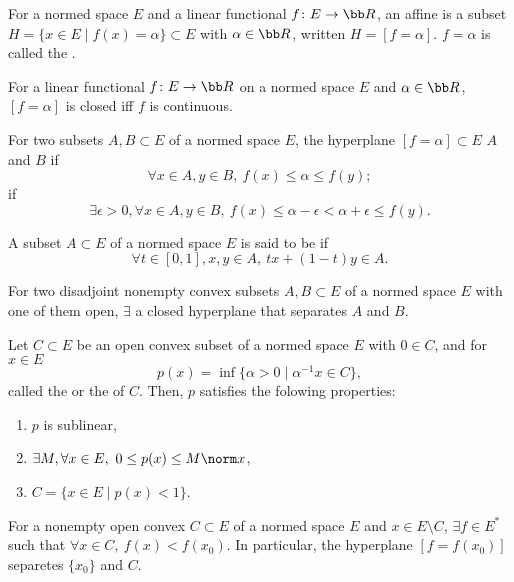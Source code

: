 For a normed space $E$ and a linear functional $f \colon E \to \bb R$, an affine  is a subset $H = \{ x \in E \mid f(x) = \alpha \} \subset E$ with $\alpha \in \bb R$, written $H = [f = \alpha]$. $f = \alpha$ is called the .

For a linear functional $f \colon E \to \bb R$ on a normed space $E$ and $\alpha \in \bb R$, $[f = \alpha]$ is closed iff $f$ is continuous.

For two subsets $A, B \subset E$ of a normed space $E$, the hyperplane $[f = \alpha] \subset E$  $A$ and $B$ if
\[
  \forall x \in A, y \in B,\ f(x) \le \alpha \le f(y);
\]
 if
\[
  \exists \epsilon > 0, \forall x \in A, y \in B,\ f(x) \le \alpha - \epsilon < \alpha + \epsilon \le f(y).
\]

A subset $A \subset E$ of a normed space $E$ is said to be  if
\[
  \forall t \in [0, 1], x, y \in A,\ tx + (1-t)y \in A.
\]

For two disadjoint nonempty convex subsets $A, B \subset E$ of a normed space $E$ with one of them open, $\exists$ a closed hyperplane that separates $A$ and $B$.

Let $C \subset E$ be an open convex subset of a normed space $E$ with $0 \in C$, and for $x \in E$
\[
  p(x) = \inf \{ \alpha > 0 \mid \alpha^{-1} x \in C \},
\]
called the  or the  of $C$.
Then, $p$ satisfies the folowing properties:
\begin{enumerate}
\item $p$ is sublinear,
\item $\exists M, \forall x \in E,\ 0 \le p(x) \le M \norm x$,
\item $C = \{ x \in E \mid p(x) < 1\}$.
\end{enumerate}

For a nonempty open convex $C \subset E$ of a normed space $E$ and $x \in E \setminus C$, $\exists f \in E^*$ such that $\forall x \in C,\ f(x) < f(x_0)$. In particular, the hyperplane $[f = f(x_0)]$ separetes $\{ x_0 \}$ and $C$.

